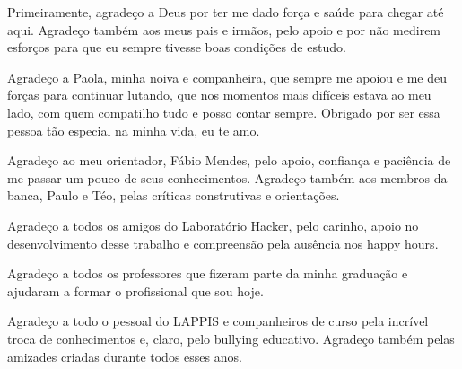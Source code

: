 \begin{agradecimentos}

Primeiramente, agradeço a Deus por ter me dado força e saúde para chegar até aqui. Agradeço também aos meus pais e irmãos, pelo apoio e por não medirem esforços para que eu sempre tivesse boas condições de estudo.

Agradeço a Paola, minha noiva e companheira, que sempre me apoiou e me deu forças para continuar lutando, que nos momentos mais difíceis estava ao meu lado, com quem compatilho tudo e posso contar sempre. Obrigado por ser essa pessoa tão especial na minha vida, eu te amo.

Agradeço ao meu orientador, Fábio Mendes, pelo apoio, confiança e paciência de me passar um pouco de seus conhecimentos. Agradeço também aos membros da banca, Paulo e Téo, pelas críticas construtivas e orientações.

Agradeço a todos os amigos do Laboratório Hacker, pelo carinho, apoio no desenvolvimento desse trabalho e compreensão pela ausência nos happy hours.

Agradeço a todos os professores que fizeram parte da minha graduação e ajudaram a formar o profissional que sou hoje.

Agradeço a todo o pessoal do LAPPIS e companheiros de curso pela incrível troca de conhecimentos e, claro, pelo bullying educativo. Agradeço também pelas amizades criadas durante todos esses anos.


\end{agradecimentos}
